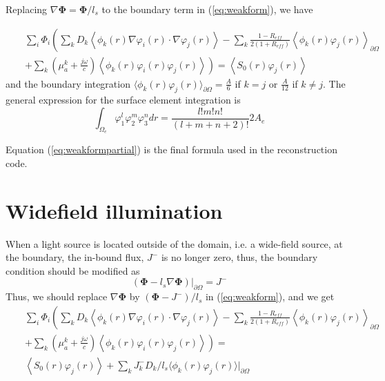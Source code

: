 \documentclass{article}
\begin{document}
Replacing $\nabla{\boldsymbol\Phi}=\boldsymbol\Phi/l_s$ to the boundary term in (\ref{eq:weakform}), we
have

\begin{eqnarray}
\label{eq:weakformpartial}\nonumber&&\sum_{i}\Phi_i\left(\sum_{k}D_k\left\langle
\phi_k(r)\nabla\varphi_i(r)\cdot\nabla\varphi_j(r)\right\rangle -
\sum_{k}\frac{1-R_{eff}}{2(1+R_{eff})}\left\langle
\phi_k(r)\varphi_j(r)\right\rangle_{\partial\Omega}\right.
\\&&\left.+\sum_{k}\left(\mu_{a}^k+\frac{j\omega}{c}\right)\left\langle\phi_k(r)\varphi_i(r)\varphi_j(r)\right\rangle\right)=\left\langle
S_0(r)\varphi_j(r)\right\rangle
\end{eqnarray}
and the boundary integration $\langle\phi_k(r)\varphi_j(r)\rangle_{\partial\Omega}=\frac{A}{6}$ if $k=j$ 
or $\frac{A}{12}$ if $k\ne j$. The general expression for the surface element integration is
\begin{equation}
\int_{\Omega_e}\varphi_1^l\varphi_2^m\varphi_3^ndr=\frac{l!m!n!}{(l+m+n+2)!}2A_e
\end{equation}


Equation (\ref{eq:weakformpartial}) is the final formula used in
the reconstruction code.

\section{Widefield illumination}
When a light source is located outside of the domain, i.e. a wide-field source, at the boundary, the 
in-bound flux, $J^-$ is no longer zero, thus, the boundary condition should be modified as
\begin{equation}
\label{eq:widefieldsrc} \left(\boldsymbol\Phi-l_s\nabla{\boldsymbol\Phi}\right)|_{\partial\Omega}=J^-
\end{equation}
Thus, we should replace $\nabla{\boldsymbol\Phi}$ by $(\boldsymbol\Phi - J^-)/l_s$ in (\ref{eq:weakform}), and we get
\begin{eqnarray}
\label{eq:weakformpartial}\nonumber&&\sum_{i}\Phi_i\left(\sum_{k}D_k\left\langle
\phi_k(r)\nabla\varphi_i(r)\cdot\nabla\varphi_j(r)\right\rangle -
\sum_{k}\frac{1-R_{eff}}{2(1+R_{eff})}\left\langle
\phi_k(r)\varphi_j(r)\right\rangle_{\partial\Omega}\right.
\\&&\left.+\sum_{k}\left(\mu_{a}^k+\frac{j\omega}{c}\right)\left\langle\phi_k(r)\varphi_i(r)\varphi_j(r)\right\rangle\right)=\\
&& \left\langle S_0(r)\varphi_j(r)\right\rangle + \sum_kJ^-_kD_k/l_s\langle\phi_k(r)\varphi_j(r)\rangle|_{\partial\Omega}
\end{eqnarray}
\end{document}
